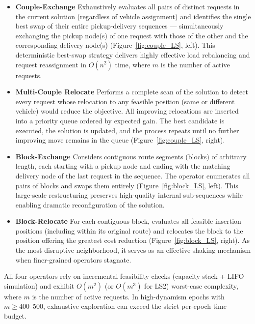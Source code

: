 \documentclass[preprint,12pt]{elsarticle}
\begin{document}
\begin{itemize}
    \item \textbf{Couple-Exchange}  
    Exhaustively evaluates all pairs of distinct requests in the current solution (regardless of vehicle assignment) and identifies the single best swap of their entire pickup-delivery sequences — simultaneously exchanging the pickup node(s) of one request with those of the other and the corresponding delivery node(s) (Figure~\ref{fig:couple_LS}, left). This deterministic best-swap strategy delivers highly effective load rebalancing and request reassignment in $O(n^2)$ time, where $m$ is the number of active requests.

    \item \textbf{Multi-Couple Relocate }  
    Performs a complete scan of the solution to detect every request whose relocation to any feasible position (same or different vehicle) would reduce the objective. All improving relocations are inserted into a priority queue ordered by expected gain. The best candidate is executed, the solution is updated, and the process repeats until no further improving move remains in the queue (Figure~\ref{fig:couple_LS}, right).

    \item \textbf{Block-Exchange }  
    Considers contiguous route segments (blocks) of arbitrary length, each starting with a pickup node and ending with the matching delivery node of the last request in the sequence. The operator enumerates all pairs of blocks and swaps them entirely (Figure~\ref{fig:block_LS}, left). This large-scale restructuring preserves high-quality internal sub-sequences while enabling dramatic reconfiguration of the solution.

    \item \textbf{Block-Relocate}  
    For each contiguous block, evaluates all feasible insertion positions (including within its original route) and relocates the block to the position offering the greatest cost reduction (Figure~\ref{fig:block_LS}, right). As the most disruptive neighborhood, it serves as an effective shaking mechanism when finer-grained operators stagnate.
\end{itemize}

All four operators rely on incremental feasibility checks (capacity stack + LIFO simulation) and exhibit $O(m^2)$ (or $O(m^3)$ for LS2) worst-case complexity, where $m$ is the number of active requests. In high-dynamism epochs with $m \ge 400–500$, exhaustive exploration can exceed the strict per-epoch time budget.
\end{document}
